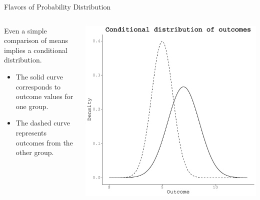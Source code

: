 \documentclass[10pt]{beamer}\usepackage[]{graphicx}\usepackage[]{color}
\makeatletter
\def\maxwidth{ %
  \ifdim\Gin@nat@width>\linewidth
    \linewidth
  \else
    \Gin@nat@width
  \fi
}
\newenvironment{knitrout}{}{} %
\makeatother
\begin{document}
\begin{frame}{Flavors of Probability Distribution}

  \begin{columns}
    \begin{column}{0.5\textwidth}
      Even a simple comparison of means implies a conditional distribution.
      \vb
      \begin{itemize}
      \item The solid curve corresponds to outcome values for one group.
        \vb
      \item The dashed curve represents outcomes from the other group.
      \end{itemize}
    \end{column}

    \begin{column}{0.5\textwidth}


\begin{knitrout}\footnotesize
{}\color{fgcolor}

{\centering \includegraphics[width=\maxwidth]{figure/unnamed-chunk-2-1} 

}


\end{knitrout}

\end{column}
\end{columns}

\end{frame}
\end{document}
